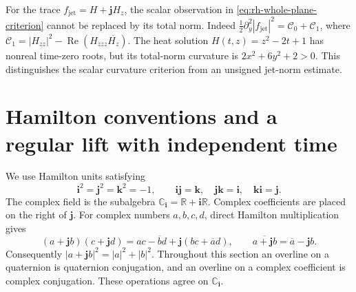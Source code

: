 \documentclass[11pt]{article}
\numberwithin{equation}{section}
\theoremstyle{definition}
\theoremstyle{remark}
\begin{document}
For the trace $f_{\mathrm{jet}}=H+\mathbf jH_z$, the scalar observation
in \eqref{eq:rh-whole-plane-criterion} cannot be replaced by its total
norm.  Indeed
$\tfrac12\partial_y^2|f_{\mathrm{jet}}|^2=\mathcal C_0+\mathcal C_1$,
where $\mathcal C_1=|H_{zz}|^2-\operatorname{Re}(H_{zzz}\overline{H_z})$.
The heat solution $H(t,z)=z^2-2t+1$ has nonreal time-zero roots,
but its total-norm curvature is $2x^2+6y^2+2>0$.  This distinguishes
the scalar curvature criterion from an unsigned jet-norm estimate.



\section{Hamilton conventions and a regular lift with independent time}
\label{sec:q21-conventions}

We use Hamilton units satisfying
\[
 \mathbf i^2=\mathbf j^2=\mathbf k^2=-1,
 \qquad \mathbf i\mathbf j=\mathbf k,
 \quad \mathbf j\mathbf k=\mathbf i,
 \quad \mathbf k\mathbf i=\mathbf j.
\]
The complex field is the subalgebra
\(\mathbb C_{\mathbf i}=\mathbb R+\mathbf i\mathbb R\).
Complex coefficients are placed on the right of \(\mathbf j\).
For complex numbers \(a,b,c,d\), direct Hamilton multiplication gives
\begin{equation}
 (a+\mathbf jb)(c+\mathbf jd)
 =ac-\overline b d+\mathbf j(bc+\overline a d),
 \qquad
 \overline{a+\mathbf jb}=\overline a-\mathbf jb.
 \label{eq:q21-product}
\end{equation}
Consequently \(|a+\mathbf jb|^2=|a|^2+|b|^2\).
Throughout this section an overline on a quaternion is quaternion
conjugation, and an overline on a complex coefficient is complex
conjugation. These operations agree on \(\mathbb C_{\mathbf i}\).
\end{document}
